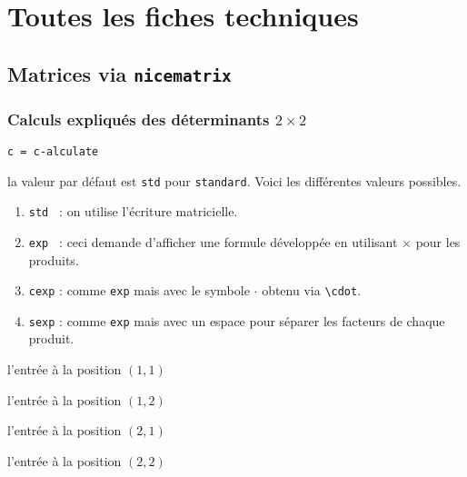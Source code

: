 \documentclass[12pt,a4paper]{article}
\newcommand\env[1]{\texttt{#1}}
\newcommand\macro[1]{\env{\textbackslash{}#1}}
\theoremstyle{definition}
\newcommand\extraspace{
	\vspace{0.25em}
}
\newcommand\mwhyprefix[2]{%
	\texttt{#1 = #1-#2}%
}
\begin{document}
\newpage
\section{Toutes les fiches techniques} \label{techincal-ids}









\subsection{Matrices via \texttt{nicematrix}}

\subsubsection{\texorpdfstring{Calculs expliqués des déterminants $2 \times 2$}%
                           {Calculs expliqués des déterminants 2x2}} \label{tnslinalg-2D-det}



 \hfill \mwhyprefix{c}{alculate}


\IDoption{} la valeur par défaut est \verb+std+ pour \verb+standard+. Voici les différentes valeurs possibles.
\begin{enumerate}
	\item \verb+std + : on utilise l'écriture matricielle.

	\item \verb+exp + : ceci demande d'afficher une formule développée en utilisant $\times$ pour les produits.

	\item \verb+cexp+ : comme \verb+exp+ mais avec le symbole $\cdot$ obtenu via \macro{cdot}.

	\item \verb+sexp+ : comme \verb+exp+ mais avec un espace pour séparer les facteurs de chaque produit.
\end{enumerate}

 l'entrée à la position $(1, 1)$

 l'entrée à la position $(1, 2)$

\extraspace

 l'entrée à la position $(2, 1)$

 l'entrée à la position $(2, 2)$                   
\end{document}
